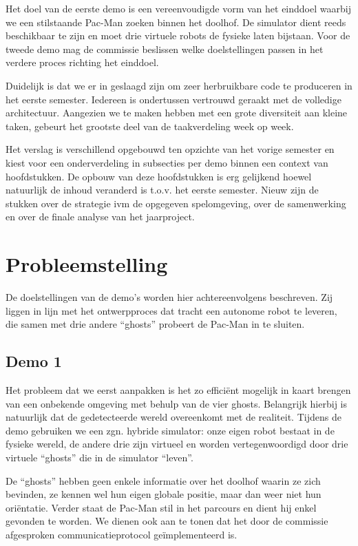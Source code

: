 \documentclass[12pt,a4paper]{report}
\begin{document}
Het doel van de eerste demo is een vereenvoudigde vorm van het einddoel waarbij we een stilstaande Pac-Man zoeken binnen het doolhof. De simulator dient  reeds beschikbaar te zijn en moet drie virtuele robots de fysieke laten bijstaan. Voor de tweede demo mag de commissie beslissen welke doelstellingen passen in het verdere proces richting het einddoel.

Duidelijk is dat we er in geslaagd zijn om zeer herbruikbare code te produceren in het eerste semester. Iedereen is ondertussen vertrouwd geraakt met de volledige architectuur. Aangezien we te maken hebben met een grote diversiteit aan kleine taken, gebeurt het grootste deel van de taakverdeling week op week.

Het verslag is verschillend opgebouwd ten opzichte van het vorige semester en kiest voor een onderverdeling in subsecties per demo binnen een context van hoofdstukken. De opbouw van deze hoofdstukken is erg gelijkend hoewel natuurlijk de inhoud veranderd is t.o.v. het eerste semester. Nieuw zijn de stukken over de strategie ivm de opgegeven spelomgeving, over de samenwerking en over de finale analyse van het jaarproject.

\chapter{Probleemstelling}

De doelstellingen van de demo's worden hier achtereenvolgens beschreven. Zij liggen in lijn met het ontwerpproces dat tracht een autonome robot te leveren, die samen met drie andere ``ghosts'' probeert de Pac-Man in te sluiten.

\section{Demo 1}

Het probleem dat we eerst aanpakken is het zo effici\"ent mogelijk in kaart brengen van een onbekende omgeving met behulp van de vier ghosts. Belangrijk hierbij is natuurlijk dat de gedetecteerde wereld overeenkomt met de realiteit. Tijdens de demo gebruiken we een zgn. hybride simulator: onze eigen robot bestaat in de fysieke wereld, de andere drie zijn virtueel en worden vertegenwoordigd door drie virtuele ``ghosts'' die in de simulator ``leven''.

De ``ghosts'' hebben geen enkele informatie over het doolhof waarin ze zich bevinden, ze kennen wel hun eigen globale positie, maar dan weer niet hun ori\"entatie. Verder staat de Pac-Man stil in het parcours en dient hij enkel gevonden te worden. We dienen ook aan te tonen dat het door de commissie afgesproken communicatieprotocol ge\"implementeerd is.
\end{document}
